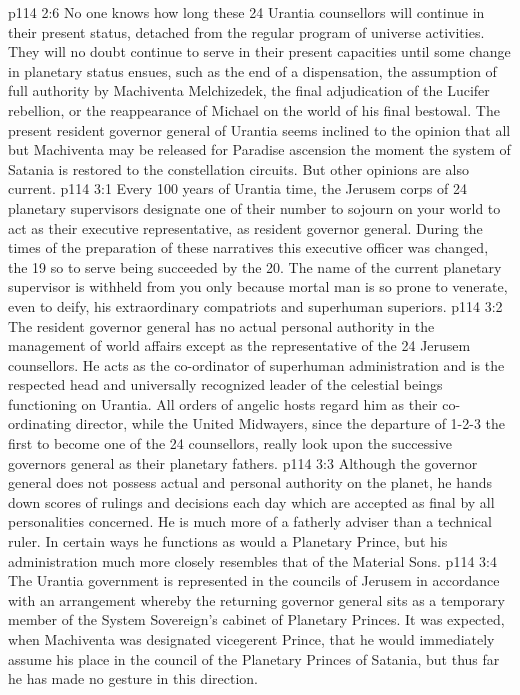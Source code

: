 \vs p114 2:6 No one knows how long these 24 Urantia counsellors will continue in their present status, detached from the regular program of universe activities. They will no doubt continue to serve in their present capacities until some change in planetary status ensues, such as the end of a dispensation, the assumption of full authority by Machiventa Melchizedek, the final adjudication of the Lucifer rebellion, or the reappearance of Michael on the world of his final bestowal. The present resident governor general of Urantia seems inclined to the opinion that all but Machiventa may be released for Paradise ascension the moment the system of Satania is restored to the constellation circuits. But other opinions are also current.
\vs p114 3:1 Every 100 years of Urantia time, the Jerusem corps of 24 planetary supervisors designate one of their number to sojourn on your world to act as their executive representative, as resident governor general. During the times of the preparation of these narratives this executive officer was changed, the 19 so to serve being succeeded by the 20. The name of the current planetary supervisor is withheld from you only because mortal man is so prone to venerate, even to deify, his extraordinary compatriots and superhuman superiors.
\vs p114 3:2 The resident governor general has no actual personal authority in the management of world affairs except as the representative of the 24 Jerusem counsellors. He acts as the co\hyp{}ordinator of superhuman administration and is the respected head and universally recognized leader of the celestial beings functioning on Urantia. All orders of angelic hosts regard him as their co\hyp{}ordinating director, while the United Midwayers, since the departure of 1\hyp{}2\hyp{}3 the first to become one of the 24 counsellors, really look upon the successive governors general as their planetary fathers.
\vs p114 3:3 Although the governor general does not possess actual and personal authority on the planet, he hands down scores of rulings and decisions each day which are accepted as final by all personalities concerned. He is much more of a fatherly adviser than a technical ruler. In certain ways he functions as would a Planetary Prince, but his administration much more closely resembles that of the Material Sons.
\vs p114 3:4 \pc The Urantia government is represented in the councils of Jerusem in accordance with an arrangement whereby the returning governor general sits as a temporary member of the System Sovereign’s cabinet of Planetary Princes. It was expected, when Machiventa was designated vicegerent Prince, that he would immediately assume his place in the council of the Planetary Princes of Satania, but thus far he has made no gesture in this direction.

